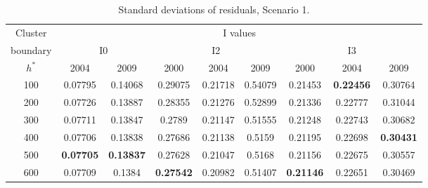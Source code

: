 \documentclass[Journal]{ascelike}
\begin{document}
\begin{table}[htbp]
\begin{center}
\caption{Standard deviations of residuals, Scenario 1.}
\begin{tabular}{l|l|l|l|l|l|l|l|l}
\hline
\multicolumn{1}{c|}{Cluster} & \multicolumn{8}{c}{I values} \\ 
\cline{2-9}
\multicolumn{1}{c|}{boundary} & \multicolumn{2}{c|}{I0} & \multicolumn{3}{c|}{I2} & \multicolumn{3}{c}{I3} \\ 
\cline{2-9}
\multicolumn{1}{c|}{$h^*$} & \multicolumn{1}{c|}{2004} & \multicolumn{1}{c|}{2009} & \multicolumn{1}{c|}{2000} & \multicolumn{1}{c|}{2004} & \multicolumn{1}{c|}{2009} & \multicolumn{1}{c|}{2000} & \multicolumn{1}{c|}{2004} & \multicolumn{1}{c}{2009} \\ 
\hline
\multicolumn{1}{c|}{100} & \multicolumn{1}{c|}{0.07795} & \multicolumn{1}{c|}{0.14068} & \multicolumn{1}{c|}{0.29075} & \multicolumn{1}{c|}{0.21718} & \multicolumn{1}{c|}{0.54079} & \multicolumn{1}{c|}{0.21453} & \multicolumn{1}{c|}{\textbf{0.22456}} & \multicolumn{1}{c}{0.30764} \\ 
\multicolumn{1}{c|}{200} & \multicolumn{1}{c|}{0.07726} & \multicolumn{1}{c|}{0.13887} & \multicolumn{1}{c|}{0.28355} & \multicolumn{1}{c|}{0.21276} & \multicolumn{1}{c|}{0.52899} & \multicolumn{1}{c|}{0.21336} & \multicolumn{1}{c|}{0.22777} & \multicolumn{1}{c}{0.31044} \\ 
\multicolumn{1}{c|}{300} & \multicolumn{1}{c|}{0.07711} & \multicolumn{1}{c|}{0.13847} & \multicolumn{1}{c|}{0.2789} & \multicolumn{1}{c|}{0.21147} & \multicolumn{1}{c|}{0.51555} & \multicolumn{1}{c|}{0.21248} & \multicolumn{1}{c|}{0.22743} & \multicolumn{1}{c}{0.30682} \\ 
\multicolumn{1}{c|}{400} & \multicolumn{1}{c|}{0.07706} & \multicolumn{1}{c|}{0.13838} & \multicolumn{1}{c|}{0.27686} & \multicolumn{1}{c|}{0.21138} & \multicolumn{1}{c|}{0.5159} & \multicolumn{1}{c|}{0.21195} & \multicolumn{1}{c|}{0.22698} & \multicolumn{1}{c}{\textbf{0.30431}} \\ 
\multicolumn{1}{c|}{500} & \multicolumn{1}{c|}{\textbf{0.07705}} & \multicolumn{1}{c|}{\textbf{0.13837}} & \multicolumn{1}{c|}{0.27628} & \multicolumn{1}{c|}{0.21047} & \multicolumn{1}{c|}{0.5168} & \multicolumn{1}{c|}{0.21156} & \multicolumn{1}{c|}{0.22675} & \multicolumn{1}{c}{0.30557} \\ 
\multicolumn{1}{c|}{600} & \multicolumn{1}{c|}{0.07709} & \multicolumn{1}{c|}{0.1384} & \multicolumn{1}{c|}{\textbf{0.27542}} & \multicolumn{1}{c|}{0.20982} & \multicolumn{1}{c|}{0.51407} & \multicolumn{1}{c|}{\textbf{0.21146}} & \multicolumn{1}{c|}{0.22651} & \multicolumn{1}{c}{0.30469} \\ 

\end{tabular}
\end{center}
\end{table}
\end{document}
